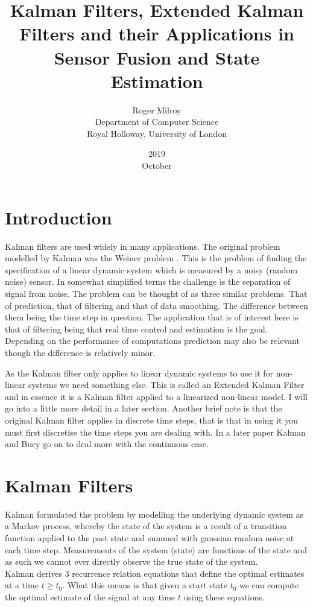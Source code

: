 \documentclass[]{article}
\begin{document}
\title{Kalman Filters, Extended Kalman Filters and their Applications in Sensor Fusion and State Estimation}
\date{2019\\ October}
\author{Roger Milroy\\ Department of Computer Science\\ Royal Holloway, University of London}

\maketitle

\section{Introduction}

Kalman filters are used widely in many applications. The original problem modelled by Kalman was the Weiner problem \cite{Kalman1960ANA}. 
This is the problem of finding the specification of a linear dynamic system which is measured by a noisy (random noise) sensor.
In somewhat simplified terms the challenge is the separation of signal from noise.
The problem can be thought of as three similar problems. That of prediction, that of filtering and that of data smoothing. The difference between them being the time step in question.
The application that is of interest here is that of filtering being that real time control and estimation is the goal. Depending on the performance of computations prediction may also be relevant though the difference is relatively minor.

As the Kalman filter only applies to linear dynamic systems to use it for non-linear systems we need something else. This is called an Extended Kalman Filter and in essence it is a Kalman filter applied to a linearized non-linear model. I will go into a little more detail in a later section.
Another brief note is that the original Kalman filter applies in discrete time steps, that is that in using it you must first discretise the time steps you are dealing with. In a later paper \cite{Klmn1961NewRI} Kalman and Bucy go on to deal more with the continuous case. \cite{}

\section{Kalman Filters}

Kalman formulated the problem by modelling the underlying dynamic system as a Markov process, whereby the state of the system is a result of a transition function applied to the past state and summed with gaussian random noise at each time step. 
Measurements of the system (state) are functions of the state and as such we cannot ever directly observe the true state of the system.
\\
Kalman derives 3 recurrence relation equations that define the optimal estimates at a time $t \geq t_0$. What this means is that given a start state $t_0$ we can compute the optimal estimate of the signal at any time $t$ using these equations.
\end{document}
